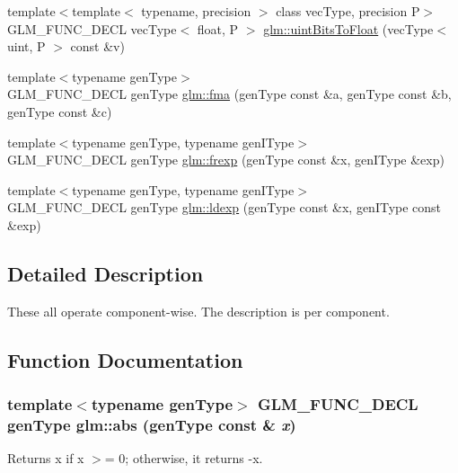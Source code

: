 \begin{CompactItemize}
\item 
{\footnotesize template$<$template$<$ typename, precision $>$ class vecType, precision P$>$ }\\GLM\_\-FUNC\_\-DECL vecType$<$ float, P $>$ \hyperlink{group__core__func__common_gda31018f0dedd22004850229eb178b0d}{glm::uintBitsToFloat} (vecType$<$ uint, P $>$ const \&v)
\item 
{\footnotesize template$<$typename genType$>$ }\\GLM\_\-FUNC\_\-DECL genType \hyperlink{group__core__func__common_ga9d229fca69599e027dd6a097938367b}{glm::fma} (genType const \&a, genType const \&b, genType const \&c)
\item 
{\footnotesize template$<$typename genType, typename genIType$>$ }\\GLM\_\-FUNC\_\-DECL genType \hyperlink{group__core__func__common_g70c119cca554aacd36008191e2c4b2bb}{glm::frexp} (genType const \&x, genIType \&exp)
\item 
{\footnotesize template$<$typename genType, typename genIType$>$ }\\GLM\_\-FUNC\_\-DECL genType \hyperlink{group__core__func__common_g4b829eccd70b08b1a349e42ae3d4f4f7}{glm::ldexp} (genType const \&x, genIType const \&exp)
\end{CompactItemize}


\subsection{Detailed Description}
These all operate component-wise. The description is per component. 

\subsection{Function Documentation}
\hypertarget{group__core__func__common_gab4b95b47f2918ce6e7ac279a0ba27c1}{
\subsubsection[abs]{\setlength{\rightskip}{0pt plus 5cm}template$<$typename genType$>$ GLM\_\-FUNC\_\-DECL genType glm::abs (genType const \& {\em x})}}
\label{group__core__func__common_gab4b95b47f2918ce6e7ac279a0ba27c1}


Returns x if x $>$= 0; otherwise, it returns -x.


